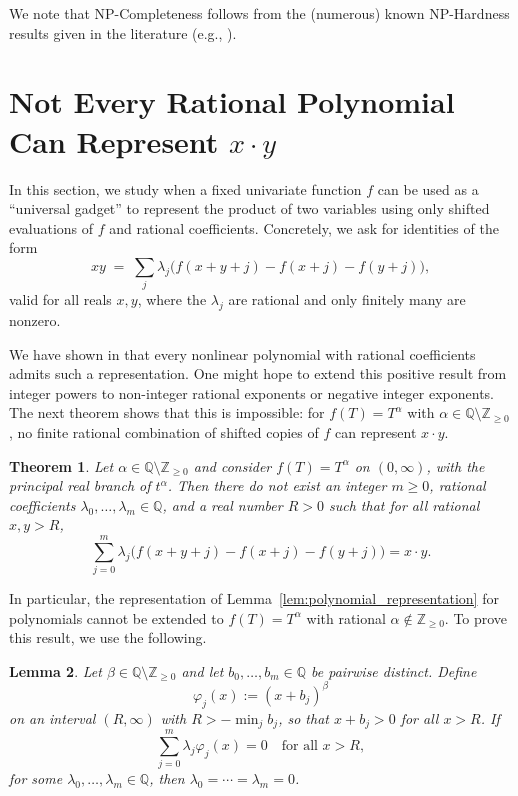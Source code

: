 \documentclass{article}
\theoremstyle{plain}
\newtheorem{theorem}{Theorem}[section]
\newtheorem{lemma}[theorem]{Lemma}
\theoremstyle{definition}
\theoremstyle{remark}
\begin{document}
We note that NP-Completeness follows from the (numerous) known NP-Hardness results given in the literature (e.g., \cite{judd1988complexity,blum1988training,vsima2002training}). 






\section{Not Every Rational Polynomial Can Represent $x \cdot y$}
\label{sec:lower_bound_poly}
In this section, we study when a fixed univariate function $f$ can be used as a
``universal gadget'' to represent the product of two variables using only
shifted evaluations of $f$ and rational coefficients.  Concretely, we ask for
identities of the form
\[
x y \;=\; \sum_{j} \lambda_j\bigl(f(x+y+j) - f(x+j) - f(y+j)\bigr),
\]
valid for all reals $x,y$, where the $\lambda_j$ are rational and only
finitely many are nonzero.

We have shown in  that every nonlinear polynomial with rational coefficients
admits such a representation. 
One might hope to extend this positive result from integer powers to
non-integer rational exponents or negative integer exponents.  The next theorem shows that this is
impossible: for $f(T) = T^\alpha$ with $\alpha \in \mathbb{Q}
\setminus \mathbb{Z}_{\ge 0}$, no finite rational combination of shifted copies of
$f$ can represent $x \cdot y$.


\begin{theorem}
	\label{thm:counter_fractional}
	Let $\alpha \in \mathbb{Q}\setminus\mathbb{Z}_{\ge 0}$ and consider
	$f(T) = T^\alpha$ on $(0,\infty)$, with the principal real branch of
	$t^\alpha$. Then there do not exist an integer $m \ge 0$, rational
	coefficients $\lambda_0,\dots,\lambda_m \in \mathbb{Q}$, and a real
	number $R>0$ such that for all rational $x,y>R$,
	\begin{equation}
		\label{eq:frac_representation}
		\sum_{j=0}^m \lambda_j\bigl(f(x+y+j) - f(x+j) - f(y+j)\bigr) = x  \cdot y.
	\end{equation}
\end{theorem} In particular, the representation of
Lemma~\ref{lem:polynomial_representation} for polynomials cannot be
extended to $f(T)=T^\alpha$ with rational $\alpha \notin \mathbb{Z}_{\ge 0}$.
To prove this result, we use the following. 

\begin{lemma}
	\label{lem:indep}
	Let $\beta \in \mathbb{Q} \setminus \mathbb{Z}_{\ge 0}$ and let
	$b_0,\dots,b_m \in \mathbb{Q}$ be pairwise distinct. Define
	\[
	\varphi_j(x) := (x+b_j)^\beta
	\]
	on an interval $(R,\infty)$ with $R>-\min_j b_j$, so that $x+b_j>0$ for all
	$x>R$.
%	
	If
	\[
	\sum_{j=0}^m \lambda_j \varphi_j(x) = 0
	\quad\text{for all } x>R,
	\]
	for some $\lambda_0,\dots,\lambda_m \in \mathbb{Q}$, then
	$\lambda_0=\cdots=\lambda_m=0$.
\end{lemma}
\end{document}

